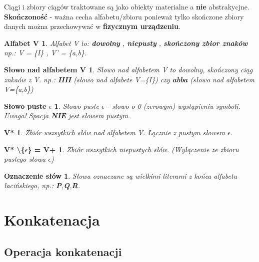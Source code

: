 Ciągi i zbiory ciągów traktowane są jako obiekty materialne a { \bf nie } abstrakycjne. \newline
{ \bf Skończoność} - ważna cecha alfabetu/zbioru ponieważ tylko skończone zbiory danych można przechowywać w { \bf fizycznym urządzeniu}. 

\newtheorem*{theorem3*}{Alfabet V}
\begin{theorem3*} Alfabet V to: { \bf dowolny} , { \bf niepusty} , { \bf skończony zbior znaków}  \newline np.: V = \{I\} , V' = \{a,b\}.
\newline


 \end{theorem3*}


\newtheorem*{theorem4*}{Słowo nad alfabetem V}
\begin{theorem4*} Słowo nad alfabetem V to dowolny, skończony ciąg znkaów z V. np.: {\bf IIII} (słowo nad alfabete V=\{I\}) czy {\bf abba} (słowo nad alfabetem V=\{a,b\}) 
 \end{theorem4*}


\newtheorem*{theorem5*}{Słowo puste $\epsilon$}
\begin{theorem5*}Słowo puste $\epsilon$ - słowo o 0 (zerowym) wystąpieniu symboli. Uwaga! Spacja {\bf NIE} jest słowem pustym.
 \end{theorem5*}
 
 
 \newtheorem*{theorem6*}{V*}
\begin{theorem6*}Zbiór wszsytkich słów nad alfabetem V. Łącznie z pustym słowem $\epsilon$.
 \end{theorem6*}
 
 
\newtheorem*{theorem7*}{V* \textbackslash \{$\epsilon$\} = V+}
\begin{theorem7*}
Zbiór wszsytkich niepustych słów. (Wyłączenie ze zbioru pustego słowa $\epsilon$)
 \end{theorem7*}
 
\newtheorem*{theorem8*}{Oznaczenie słów}
\begin{theorem8*}
Słowa oznaczane są wielkimi literami z końca alfabetu łacińskiego, np.: { \bf P},{\bf Q},{\bf R}. 
 \end{theorem8*}


\newpage
\section{Konkatenacja}
\subsection{Operacja konkatenacji}

